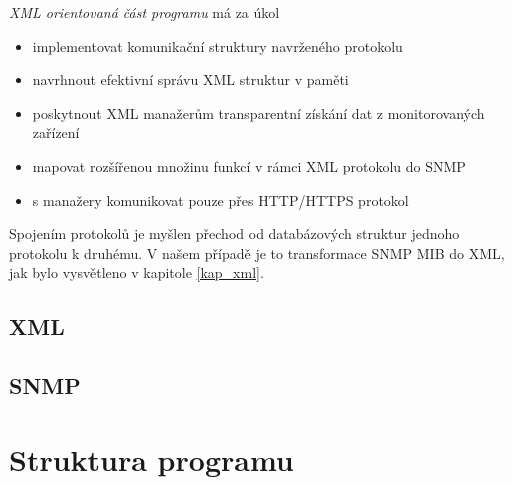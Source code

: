 \textit{XML orientovaná část programu } má za úkol
\begin{itemize}
	\item implementovat komunikační struktury navrženého protokolu
	\item navrhnout efektivní správu XML struktur v paměti
	\item poskytnout XML manažerům transparentní získání dat z monitorovaných zařízení
	\item mapovat rozšířenou množinu funkcí v rámci XML protokolu do SNMP
	\item s manažery komunikovat pouze přes HTTP/HTTPS protokol
\end{itemize}

Spojením protokolů je myšlen přechod od databázových struktur jednoho protokolu k druhému. V našem případě je to transformace SNMP MIB do XML, jak bylo vysvětleno v kapitole \ref{kap_xml}.

\subsection{XML}


\subsection{SNMP}



\section{Struktura programu}
